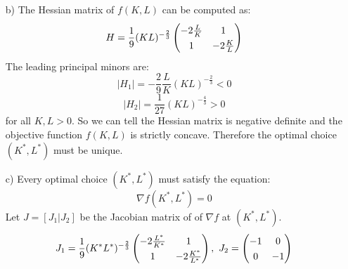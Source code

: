 \documentclass{article}
\begin{document}
\begin{enumerate}
\begin{enumerate}
            \item[b)] The Hessian matrix of $f(K,L)$ can be computed as:
            \[
                H = \frac{1}{9}(KL)^{-\frac{2}{3}}
                \def\arraystretch{1.3}
                \begin{pmatrix}
                    -2\frac{L}{K} & 1 \\
                    1 & -2\frac{K}{L} \\
                \end{pmatrix}
            \]
            The leading principal minors are: 
            $$|H_1| = -\dfrac{2}{9}\dfrac{L}{K}(KL)^{-\frac{2}{3}} < 0 $$
            $$|H_2| = \dfrac{1}{27}(KL)^{-\frac{4}{3}} > 0 $$
            for all $K,L > 0$. 
            So we can tell the Hessian matrix is negative definite and the objective function 
            $f(K,L)$ is strictly concave. Therefore the optimal choice $(K^*, L^*)$ must be unique.\\
            
            \item[c)] Every optimal choice $(K^*, L^*)$ must satisfy the equation:
            $$ \nabla f(K^*, L^*) =0 $$
            Let $J=[J_1|J_2]$ be the Jacobian matrix of of $\nabla f$ at $(K^*, L^*)$. 
            \[
                J_1 = \frac{1}{9}(K^* L^*)^{-\frac{2}{3}}
                \def\arraystretch{1.3}
                \begin{pmatrix}
                    -2\frac{L^*}{K^*} & 1 \\
                    1 & -2\frac{K^*}{L^*} \\
                \end{pmatrix},\
                J_2 = \begin{pmatrix}
                -1 & 0 \\
                0 & -1 \\
                \end{pmatrix}
            \]
            

\end{enumerate}
\end{enumerate}
\end{document}
